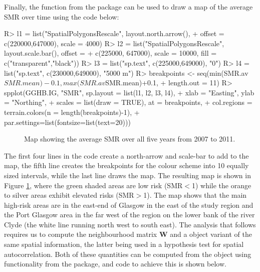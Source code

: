 \documentclass[article, nojss]{jss}
\begin{document}
Finally, the  function from the  package can be used to draw a map of the average SMR over time using the code below:


\begin{Schunk}
\begin{Sinput}
R> l1 = list("SpatialPolygonsRescale", layout.north.arrow(), 
+     offset = c(220000,647000), scale = 4000)
R> l2 = list("SpatialPolygonsRescale", layout.scale.bar(), offset = 
+     c(225000, 647000), scale = 10000, fill = c("transparent","black"))
R> l3 = list("sp.text", c(225000,649000), "0")
R> l4 = list("sp.text", c(230000,649000), "5000 m")
R> breakpoints <- seq(min(SMR.av$SMR.mean)-0.1, max(SMR.av$SMR.mean)+0.1, 
+     length.out = 11)
R> spplot(GGHB.IG, "SMR", sp.layout = list(l1, l2, l3, l4),
+     xlab = "Easting", ylab = "Northing", 
+     scales = list(draw = TRUE),  at = breakpoints, 
+     col.regions = terrain.colors(n = length(breakpoints)-1),
+     par.settings=list(fontsize=list(text=20)))
\end{Sinput}
\end{Schunk}


\begin{figure}
\centering 
{}
\caption{Map showing the average SMR over all five years from 2007 to 2011.\label{smr_map}}
\end{figure} 


The first four lines in the code create a north-arrow and scale-bar to add to the map, the fifth line creates the breakpoints for the colour scheme into 10 equally sized intervals, while the last line draws the map. The resulting map is shown in Figure \ref{smr_map}, where the green shaded areas are low risk (SMR$<$1) while the orange to silver areas exhibit elevated risks (SMR$>$1). The map shows that the main high-risk areas are in the east-end of Glasgow in the east of the study region and the Port Glasgow area in the far west of the region on the lower bank of the river Clyde (the white line running north west to south east). The analysis that follows requires us to compute the neighbourhood matrix $\mathbf{W}$ and a  object variant of the same spatial information, the latter being used in a hypothesis test for spatial autocorrelation. Both of these quantities can be computed from the   object using functionality from the  package, and code to achieve this is  shown below.
\end{document}
